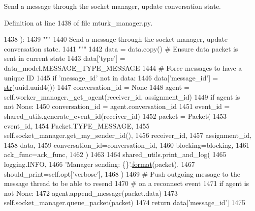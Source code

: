 \begin{DoxyVerb}Send a message through the socket manager, update conversation state.
\end{DoxyVerb}
 

Definition at line 1438 of file mturk\+\_\+manager.\+py.


\begin{DoxyCode}
1438     ):
1439         \textcolor{stringliteral}{"""}
1440 \textcolor{stringliteral}{        Send a message through the socket manager, update conversation state.}
1441 \textcolor{stringliteral}{        """}
1442         data = data.copy()  \textcolor{comment}{# Ensure data packet is sent in current state}
1443         data[\textcolor{stringliteral}{'type'}] = data\_model.MESSAGE\_TYPE\_MESSAGE
1444         \textcolor{comment}{# Force messages to have a unique ID}
1445         \textcolor{keywordflow}{if} \textcolor{stringliteral}{'message\_id'} \textcolor{keywordflow}{not} \textcolor{keywordflow}{in} data:
1446             data[\textcolor{stringliteral}{'message\_id'}] = \hyperlink{namespacegenerate__task__READMEs_a5b88452ffb87b78c8c85ececebafc09f}{str}(uuid.uuid4())
1447         conversation\_id = \textcolor{keywordtype}{None}
1448         agent = self.worker\_manager.\_get\_agent(receiver\_id, assignment\_id)
1449         \textcolor{keywordflow}{if} agent \textcolor{keywordflow}{is} \textcolor{keywordflow}{not} \textcolor{keywordtype}{None}:
1450             conversation\_id = agent.conversation\_id
1451         event\_id = shared\_utils.generate\_event\_id(receiver\_id)
1452         packet = Packet(
1453             event\_id,
1454             Packet.TYPE\_MESSAGE,
1455             self.socket\_manager.get\_my\_sender\_id(),
1456             receiver\_id,
1457             assignment\_id,
1458             data,
1459             conversation\_id=conversation\_id,
1460             blocking=blocking,
1461             ack\_func=ack\_func,
1462         )
1463 
1464         shared\_utils.print\_and\_log(
1465             logging.INFO,
1466             \textcolor{stringliteral}{'Manager sending: \{\}'}.\hyperlink{namespaceparlai_1_1chat__service_1_1services_1_1messenger_1_1shared__utils_a32e2e2022b824fbaf80c747160b52a76}{format}(packet),
1467             should\_print=self.opt[\textcolor{stringliteral}{'verbose'}],
1468         )
1469         \textcolor{comment}{# Push outgoing message to the message thread to be able to resend}
1470         \textcolor{comment}{# on a reconnect event}
1471         \textcolor{keywordflow}{if} agent \textcolor{keywordflow}{is} \textcolor{keywordflow}{not} \textcolor{keywordtype}{None}:
1472             agent.append\_message(packet.data)
1473         self.socket\_manager.queue\_packet(packet)
1474         \textcolor{keywordflow}{return} data[\textcolor{stringliteral}{'message\_id'}]
1475 
\end{DoxyCode}

